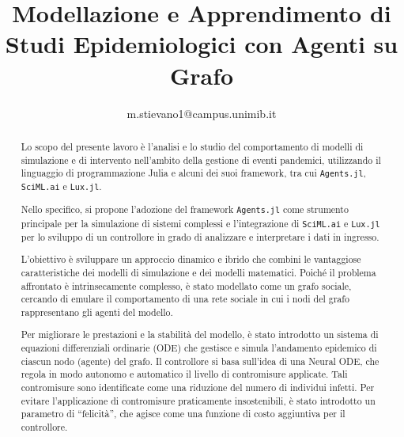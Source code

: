 \documentclass[11pt,a4paper,fleqn]{article}
\title{Modellazione e Apprendimento di Studi Epidemiologici con Agenti su Grafo}
\author{m.stievano1@campus.unimib.it}
\begin{document}


\begin{abstract}
    Lo scopo del presente lavoro è l'analisi e lo studio del comportamento 
    di modelli di simulazione e di intervento nell'ambito della gestione 
    di eventi pandemici, utilizzando il linguaggio di programmazione Julia 
    e alcuni dei suoi framework, tra cui \texttt{Agents.jl}, \texttt{SciML.ai} e \texttt{Lux.jl}.

    Nello specifico, si propone l'adozione del framework \texttt{Agents.jl} come 
    strumento principale per la simulazione di sistemi complessi e 
    l'integrazione di \texttt{SciML.ai} e \texttt{Lux.jl} per lo sviluppo di un controllore 
    in grado di analizzare e interpretare i dati in ingresso. 
    
    L'obiettivo è sviluppare un approccio dinamico e ibrido che combini 
    le vantaggiose caratteristiche dei modelli di simulazione e dei 
    modelli matematici. Poiché il problema affrontato è intrinsecamente 
    complesso, è stato modellato come un grafo sociale, 
    cercando di emulare il comportamento di una rete sociale in cui i 
    nodi del grafo rappresentano gli agenti del modello.
    
    Per migliorare le prestazioni e la stabilità del modello, è stato 
    introdotto un sistema di equazioni differenziali ordinarie (ODE) 
    che gestisce e simula l'andamento epidemico di ciascun nodo (agente) 
    del grafo. Il controllore si basa sull'idea di una Neural ODE, 
    che regola in modo autonomo e automatico il livello di contromisure 
    applicate. Tali contromisure sono identificate come una riduzione 
    del numero di individui infetti. Per evitare l'applicazione di 
    contromisure praticamente insostenibili, è stato introdotto un 
    parametro di ``felicità'', che agisce come una funzione di costo 
    aggiuntiva per il controllore.
\end{abstract}


\tableofcontents
\newpage
\listoffigures
\listoftables
\newpage








\end{document}

